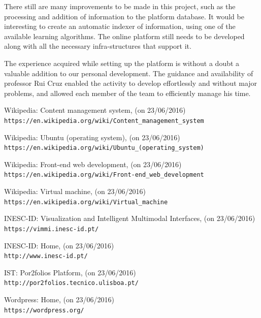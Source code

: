 \documentclass[a4paper,12pt,journal,twoside,compsoc]{PPIEEEtran}
\begin{document}
There still are many improvements to be made in this project, such as the processing and addition of information to the platform database. It would be interesting to create an automatic indexer of information, using one of the available learning algorithms. The online platform still needs to be developed along with all the necessary infra-structures that support it.

The experience acquired while setting up the platform is without a doubt a valuable addition to our personal development. The guidance and availability of professor Rui Cruz enabled the activity to develop effortlessly and without major problems, and allowed each member of the team to efficiently manage his time.


\clearpage

\begin{thebibliography}{9}
% 
 
Wikipedia: Content management system, (on 23/06/2016)
\\\texttt{https://en.wikipedia.org/wiki/Content\_management\_system}

Wikipedia: Ubuntu (operating system), (on 23/06/2016)
\\\texttt{https://en.wikipedia.org/wiki/Ubuntu\_(operating\_system)}

Wikipedia: Front-end web development, (on 23/06/2016)
\\\texttt{https://en.wikipedia.org/wiki/Front-end\_web\_development}

Wikipedia: Virtual machine, (on 23/06/2016)
\\\texttt{https://en.wikipedia.org/wiki/Virtual\_machine}

INESC-ID: Visualization and Intelligent Multimodal Interfaces, (on 23/06/2016)
\\\texttt{https://vimmi.inesc-id.pt/}

INESC-ID: Home, (on 23/06/2016)
\\\texttt{http://www.inesc-id.pt/}

IST: Por2folios Platform, (on 23/06/2016)
\\\texttt{http://por2folios.tecnico.ulisboa.pt/}

Wordpress: Home, (on 23/06/2016)
\\\texttt{https://wordpress.org/}

\end{thebibliography}
\end{document}
